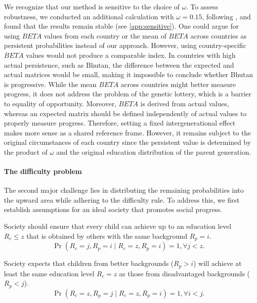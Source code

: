 We recognize that our method is sensitive to the choice of \(\omega\). To assess robustness, we conducted an additional calculation with \(\omega = 0.15\), following \citet{fleury2018intergenerational}, and found that the results remain stable (see \ref{app:sensitive}). One could argue for using \(BETA\) values from each country or the mean of \(BETA\) across countries as persistent probabilities instead of our approach. However, using country-specific \(BETA\) values would not produce a comparable index. In countries with high actual persistence, such as Bhutan, the difference between the expected and actual matrices would be small, making it impossible to conclude whether Bhutan is progressive. While the mean \(BETA\) across countries might better measure progress, it does not address the problem of the genetic lottery, which is a barrier to equality of opportunity. Moreover, \(BETA\) is derived from actual values, whereas an expected matrix should be defined independently of actual values to properly measure progress. 
Therefore, setting a fixed intergenerational effect makes more sense as a shared reference frame. However, it remains subject to the original circumstances of each country since the persistent value is determined by the product of \(\omega\) and the original education distribution of the parent generation.

\paragraph{The difficulty problem}

The second major challenge lies in distributing the remaining probabilities into the upward area while adhering to the difficulty rule. To address this, we first establish assumptions for an ideal society that promotes social progress.

\begin{assumption} \label{assump:1}
Society should ensure that every child can achieve up to  an education level \( R_c \leq z \)  that is obtained by others  with the same background \( R_p = i \).
\[
\operatorname{Pr}(R_c = j, R_p = i \mid R_c = z, R_p = i) = 1, \forall j < z.
\]
\end{assumption}

\begin{assumption} \label{assump:2}
Society expects that children from better backgrounds (\( R_p > i \)) will achieve at least the same education level \( R_c = z \) as those from disadvantaged backgrounds (\( R_p < j \)).
\[
\operatorname{Pr}(R_c = z, R_p = j \mid R_c = z, R_p = i) = 1, \forall i < j.
\]
\end{assumption}


